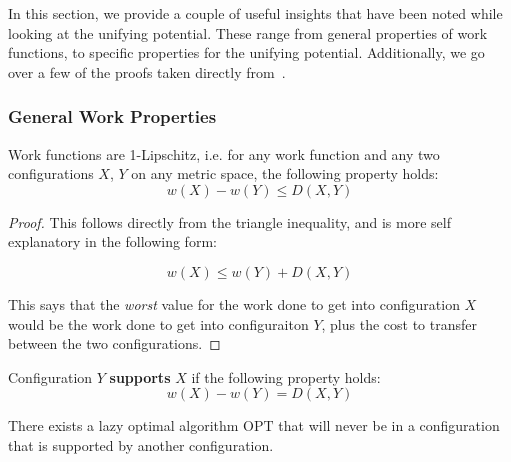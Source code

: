 In this section, we provide a couple of useful insights that have been noted while looking at the unifying potential. These range from general properties of work functions, to specific properties for the unifying potential. Additionally, we go over a few of the proofs taken directly from~\cite{unifyingPotential2021}. 

\subsubsection*{General Work Properties}

\begin{lemma}
    \label{lem:lip}
    Work functions are 1-Lipschitz, i.e. for any work function and any two configurations $X$, $Y$ on any metric space, the following property holds: 
    \begin{equation*}
        w(X) - w(Y) \leq D(X, Y)
    \end{equation*} 
\end{lemma}

\begin{proof}
    This follows directly from the triangle inequality, and is more self explanatory in the following form: 
    
    \begin{equation*}
        w(X) \leq w(Y) + D(X, Y)
    \end{equation*}

    This says that the \textit{worst} value for the work done to get into configuration $X$ would be the work done to get into configuraiton $Y$, plus the cost to transfer between the two configurations.
\end{proof}

\begin{definition}
    Configuration $Y$ \textbf{supports} $X$ if the following property holds:
    \begin{equation*}
        w(X) - w(Y) = D(X,Y)
    \end{equation*}
\end{definition}

\begin{lemma}
    There exists a lazy optimal algorithm $\mathrm{OPT}$ that will never be in a configuration that is supported by another configuration.
\end{lemma}

